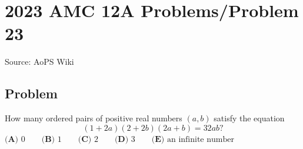 \documentclass[12pt]{article}
\begin{document}
\section*{{2023 AMC 12A Problems/Problem 23}}
Source: AoPS Wiki

\subsection*{Problem}
How many ordered pairs of positive real numbers $(a,b)$ satisfy the equation \[(1+2a)(2+2b)(2a+b) = 32ab?\] $\textbf{(A) }0\qquad\textbf{(B) }1\qquad\textbf{(C) }2\qquad\textbf{(D) }3\qquad\textbf{(E) }\text{an infinite number}$
\end{document}
